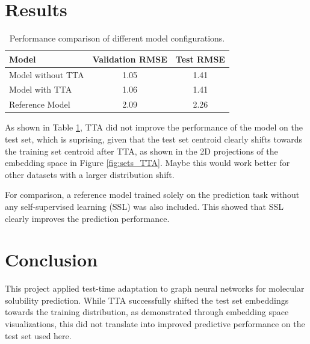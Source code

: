 \documentclass[11pt,a4paper]{article}
\begin{document}
\section{Results}

\begin{table}[htbp]
        \centering
        \begin{tabular}{@{}lcc@{}}
                \toprule
                \textbf{Model}    & \textbf{Validation RMSE} & \textbf{Test RMSE} \\
                \midrule
                Model without TTA & 1.05                     & 1.41               \\
                Model with TTA    & 1.06                     & 1.41               \\
                Reference Model   & 2.09                     & 2.26               \\
                \bottomrule
        \end{tabular}
        \caption{Performance comparison of different model configurations.}
        \label{tab:results}
\end{table}

As shown in Table \ref{tab:results}, TTA did not improve the performance of the model on the test set, which is suprising, given that the test set centroid clearly shifts towards the training set centroid after TTA, as shown in the 2D projections of the embedding space in Figure \ref{fig:sets_TTA}. Maybe this would work better for other datasets with a larger distribution shift.

For comparison, a reference model trained solely on the prediction task without any self-supervised learning (SSL) was also included. This showed that SSL clearly improves the prediction performance.

\section{Conclusion}

This project applied test-time adaptation to graph neural networks for molecular solubility prediction. While TTA successfully shifted the test set embeddings towards the training distribution, as demonstrated through embedding space visualizations, this did not translate into improved predictive performance on the test set used here.



\end{document}
